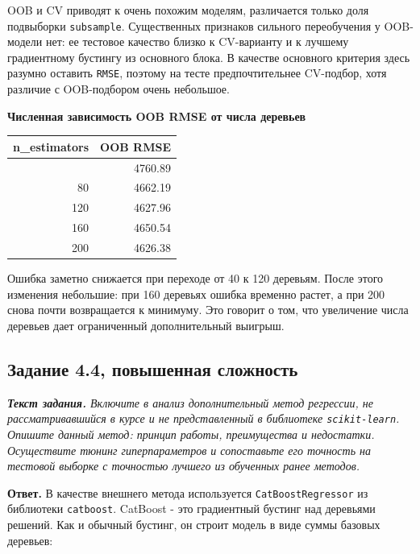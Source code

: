 \documentclass[11pt]{article}
\newcounter{none}
\newenvironment{tasktext}
      {\begin{tcolorbox}[breakable, colback=black!3, colframe=black!28,
        boxrule=0.4pt, arc=1.5mm, left=7pt, right=7pt, top=5pt, bottom=5pt,
        before skip=0.35em, after skip=0.75em]\itshape}
      {\end{tcolorbox}}
\begin{document}
OOB и CV приводят к очень похожим моделям, различается только доля
подвыборки \texttt{subsample}. Существенных признаков сильного
переобучения у OOB-модели нет: ее тестовое качество близко к CV-варианту
и к лучшему градиентному бустингу из основного блока. В качестве
основного критерия здесь разумно оставить \texttt{RMSE}, поэтому на
тесте предпочтительнее CV-подбор, хотя различие с OOB-подбором очень
небольшое.

\textbf{Численная зависимость OOB RMSE от числа деревьев}

{\def\LTcaptype{none} %
\begin{longtable}[]{@{}rr@{}}
\toprule\noalign{}
n\_estimators & OOB RMSE \\
\midrule\noalign{}
\endhead
\bottomrule\noalign{}
\endlastfoot
40 & 4760.89 \\
80 & 4662.19 \\
120 & 4627.96 \\
160 & 4650.54 \\
200 & 4626.38 \\
\end{longtable}
}

Ошибка заметно снижается при переходе от 40 к 120 деревьям. После этого
изменения небольшие: при 160 деревьях ошибка временно растет, а при 200
снова почти возвращается к минимуму. Это говорит о том, что увеличение
числа деревьев дает ограниченный дополнительный выигрыш.

    \subsection{Задание 4.4, повышенная
сложность}\label{ux437ux430ux434ux430ux43dux438ux435-4.4-ux43fux43eux432ux44bux448ux435ux43dux43dux430ux44f-ux441ux43bux43eux436ux43dux43eux441ux442ux44c}

\begin{tasktext}
\textbf{Текст задания.} Включите в анализ дополнительный метод
регрессии, не рассматривавшийся в курсе и не представленный в библиотеке
\texttt{scikit-learn}. Опишите данный метод: принцип работы,
преимущества и недостатки. Осуществите тюнинг гиперпараметров и
сопоставьте его точность на тестовой выборке с точностью лучшего из
обученных ранее методов.
\end{tasktext}

\textbf{Ответ.} В качестве внешнего метода используется
\texttt{CatBoostRegressor} из библиотеки \texttt{catboost}. CatBoost -
это градиентный бустинг над деревьями решений. Как и обычный бустинг, он
строит модель в виде суммы базовых деревьев:
\end{document}
